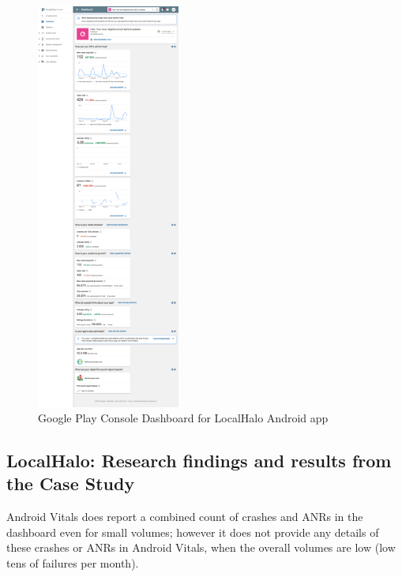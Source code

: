 \begin{figure}
  \begin{center}
    \includegraphics[width=0.42\textwidth]{images/google-play-console/resized-25pct-appdashboardplace_555059634831.png}
  \end{center}
  \caption{Google Play Console Dashboard for LocalHalo Android app}
  \label{fig:gpc-dashboard-for-localhalo-android-resized}
\end{figure}


\subsection{LocalHalo: Research findings and results from the Case Study}

Android Vitals does report a combined count of crashes and ANRs in the dashboard even for small volumes; however it does not provide any details of these crashes or ANRs in Android Vitals, when the overall volumes are low (low tens of failures per month).

